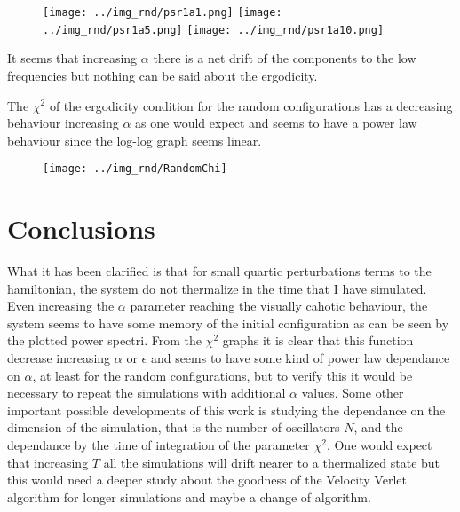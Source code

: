 \documentclass[10pt]{article}
\numberwithin{equation}{section}
\begin{document}
\begin{figure}[!htb]
    \texttt{[image: ../img\_rnd/psr1a1.png]}
\endminipage \hfill
{}
    \texttt{[image: ../img\_rnd/psr1a5.png]}
\endminipage \hfill
{}
    \texttt{[image: ../img\_rnd/psr1a10.png]}
\endminipage 
\end{figure}

It seems that increasing $\alpha$ there is a net drift of the components to the low frequencies but nothing can be said about the ergodicity.

The $\chi^2$ of the ergodicity condition for the random configurations has a decreasing behaviour increasing $\alpha$ as one would expect and seems to have a power law behaviour since the log-log graph seems linear.

\begin{figure}[!htb]
\centering
\texttt{[image: ../img\_rnd/RandomChi]}
\end{figure}

\section{Conclusions}

What it has been clarified is that for small quartic perturbations terms to the hamiltonian, the system do not thermalize in the time that I have simulated. Even increasing the $\alpha$ parameter reaching the visually cahotic behaviour, the system seems to have some memory of the initial configuration as can be seen by the plotted power spectri. From the $\chi^2$ graphs it is clear that this function decrease increasing $\alpha$ or $\epsilon$ and seems to have some kind of power law dependance on $\alpha$, at least for the random configurations, but to verify this it would be necessary to repeat the simulations with additional $\alpha$ values. Some other important possible developments of this work is studying the dependance on the dimension of the simulation, that is the number of oscillators $N$, and the dependance by the time of integration of the parameter $\chi^2$. One would expect that increasing $T$ all the simulations will drift nearer to a thermalized state but this would need a deeper study about the goodness of the Velocity Verlet algorithm for longer simulations and maybe a change of algorithm.



\printbibliography
\end{document}
